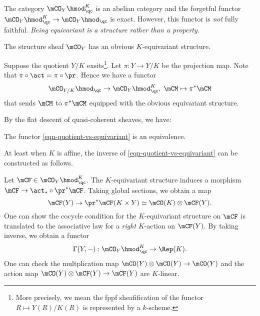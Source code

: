 	\begin{rem}
		The category $\mCO_Y \hmod_\qc^K$ is an abelian category and the forgetful functor $\mCO_Y \hmod_\qc^K\to \mCO_Y \hmod_\qc$ is exact. However, this functor is \emph{not} fully faithful. \emph{Being equivariant is a structure rather than a property}.
	\end{rem}

	\begin{exam}
		The structure sheaf $\mCO_Y$ has an obvious $K$-equivariant structure.
	\end{exam}

	\begin{constr}
		Suppose the quotient $Y/K$ exsits\footnote{More precisely, we mean the fppf sheafification of the functor $R \mapsto Y(R)/K(R)$ is represented by a $k$-scheme.}. Let $\pi:Y\to Y/K$ be the projection map. Note that $\pi\circ \act = \pi\circ \pr$. Hence we have a functor
		\begin{equation}
			\label{eqn-quotient-vs-equivariant}
			\mCO_{Y/K}\hmod_\qc \to \mCO_Y \hmod_\qc^K,\; \mCM \mapsto \pi^*\mCM
		\end{equation}
		that sends $\mCM$ to $\pi^*\mCM$ equipped with the obvious equivariant structure.

	\end{constr}

	By the flat descent of quasi-coherent sheaves, we have:

	\begin{prop}
		The functor \eqref{eqn-quotient-vs-equivariant} is an equivalence.
	\end{prop}

	At least when $K$ is affine, the inverse of \eqref{eqn-quotient-vs-equivariant} can be constructed as follows.

	\begin{constr}
		\label{constr-inverse-quotient-vs-equivariant}
	
		Let $\mCF\in \mCO_Y \hmod_\qc^K$. The $K$-equivariant structure induces a morphism $\mCF \to \act_* \circ \pr^* \mCF$. Taking global sections, we obtain a map
		\[
			\mCF(Y) \to \pr^*\mCF(K\mt Y) \simeq \mCO(K) \ot \mCF(Y).
		\]
		One can show the cocycle condition for the $K$-equivariant structure on $\mCF$ is translated to the associative law for a \emph{right} $K$-action on $\mCF(Y)$. By taking inverse, we obtain a functor
		\[
			\Gamma(Y,-): \mCO_Y \hmod_\qc^K \to \Rep(K).
		\]
		One can check the multplication map $\mCO(Y)\ot \mCO(Y)\to \mCO(Y)$ and the action map $\mCO(Y)\ot \mCF(Y) \to \mCF(Y)$ are $K$-linear.
	\end{constr}

